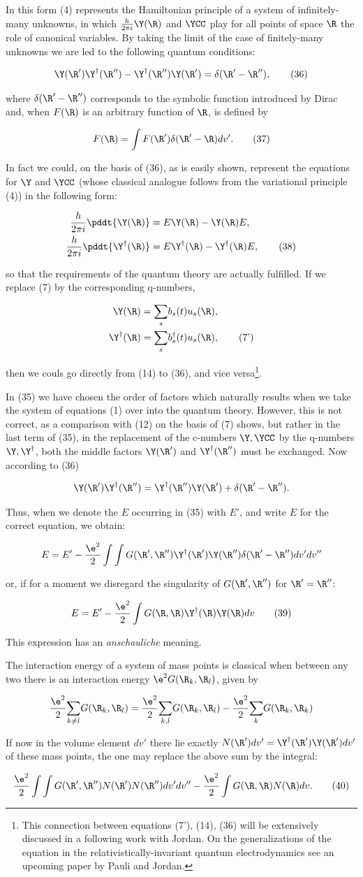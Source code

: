 \documentclass{article}
\newcommand{\nequ}[2]{
\begin{align*}
#1
\tag{#2}
\end{align*}
}
\newcommand{\uequ}[1]{
\begin{align*}
#1
\end{align*}
}
\newcommand{\sumX}[1]{\underset{#1}{\sum}}
\begin{document}
In this form (4) represents the Hamiltonian principle of a system of infinitely-many unknowns, in which $\frac{h}{2\pi i}\Y(\R)$ and $\YCC$ play for all points of space $\R$ the role of canonical variables. By taking the limit of the case of finitely-many unknowns we are led to the following quantum conditions:
\nequ{
\Y(\R')\Y^{\dagger}(\R'') - \Y^{\dagger}(\R'')\Y(\R') = \delta(\R'-\R''),
}{36}
where $\delta(\R'-\R'')$ corresponds to the symbolic function introduced by Dirac and, when $F(\R)$ is an arbitrary function of $\R$, is defined by
\nequ{
F(\R) = \int F(\R')\delta(\R' - \R)dv'.
}{37}
In fact we could, on the basis of (36), as is easily shown, represent the equations for $\Y$ and $\YCC$ (whose classical analogue follows from the variational principle (4)) in the following form:
\nequ{
\frac{h}{2\pi i} \pddt{\Y(\R)} &= E\Y(\R) - \Y(\R)E,\\
\frac{h}{2\pi i} \pddt{\Y^{\dagger}(\R)} &= E\Y^{\dagger}(\R) - \Y^{\dagger}(\R)E,
}{38}
so that the requirements of the quantum theory are actually fulfilled. If we replace (7) by the corresponding q-numbers,
\nequ{
\Y(\R) &= \sumX{s}b_s(t)u_s(\R),\\
\Y^{\dagger}(\R) &= \sumX{s}b^{\dagger}_s(t)u_s(\R),
}{7'}
then we couls go directly from (14) to (36), and vice versa\footnote{This connection between equations (7'), (14), (36) will be extensively discussed in a following work with Jordan. On the generalizations of the equation in the relativistically-invariant quantum electrodynamics see an upcoming paper by Pauli and Jordan.}.

In (35) we have chosen the order of factors which naturally results when we take the system of equations (1) over into the quantum theory. However, this is not correct, as a comparison with (12) on the basis of (7) shows, but rather in the last term of (35), in the replacement of the c-numbers $\Y,\YCC$ by the q-numbers $\Y,\Y^\dagger$, both the middle factors $\Y(\R')$ and $\Y^\dagger(\R'')$ must be exchanged. Now according to (36)
\uequ{
\Y(\R')\Y^\dagger(\R'') = \Y^\dagger(\R'')\Y(\R') + \delta(\R' - \R'').
}
Thus, when we denote the $E$ occurring in (35) with $E'$, and write $E$ for the correct equation, we obtain:
\uequ{
E = E' - \frac{\e^2}{2}\int\int G(\R',\R'')\Y^\dagger(\R')\Y(\R'')\delta(\R'-\R'')dv' dv''
}
or, if for a moment we disregard the singularity of $G(\R',\R'')$ for $\R'=\R''$:
\nequ{
E = E' - \frac{\e^2}{2}\int G(\R,\R)\Y^\dagger(\R)\Y(\R)dv
}{39}
This expression has an \textit{anschauliche} meaning.

The interaction energy of a system of mass points is classical when between any two there is an interaction energy $\e^2 G(\R_k,\R_l)$, given by
\uequ{
\frac{\e^2}{2} \sumX{k\neq l}G(\R_k,\R_l) = 
\frac{\e^2}{2}\sumX{k,l}G(\R_k,\R_l) - 
\frac{\e^2}{2}\sumX{k}G(\R_k,\R_k)
}
If now in the volume element $dv'$ there lie exactly $N(\R')dv'=\Y^\dagger(\R')\Y(\R')dv'$ of these mass points, the one may replace the above sum by the integral:
\nequ{
\frac{\e^2}{2}\int\int G(\R',\R'')N(\R')N(\R'')dv' dv'' - \frac{\e^2}{2}\int G(\R, \R) N(\R) dv.
}{40}
\end{document}
